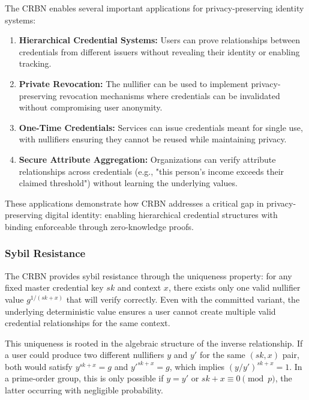 The CRBN enables several important applications for privacy-preserving identity systems:

\begin{enumerate}
    \item \textbf{Hierarchical Credential Systems:} Users can prove relationships between credentials from different issuers without revealing their identity or enabling tracking.
    
    \item \textbf{Private Revocation:} The nullifier can be used to implement privacy-preserving revocation mechanisms where credentials can be invalidated without compromising user anonymity.
    
    \item \textbf{One-Time Credentials:} Services can issue credentials meant for single use, with nullifiers ensuring they cannot be reused while maintaining privacy.
    
    \item \textbf{Secure Attribute Aggregation:} Organizations can verify attribute relationships across credentials (e.g., "this person's income exceeds their claimed threshold") without learning the underlying values.
\end{enumerate}

These applications demonstrate how CRBN addresses a critical gap in privacy-preserving digital identity: enabling hierarchical credential structures with binding enforceable through zero-knowledge proofs.


\subsubsection{Sybil Resistance}

The CRBN provides sybil resistance through the uniqueness property: for any fixed master credential key $sk$ and context $x$, there exists only one valid nullifier value $g^{1/(sk+x)}$ that will verify correctly. Even with the committed variant, the underlying deterministic value ensures a user cannot create multiple valid credential relationships for the same context.

This uniqueness is rooted in the algebraic structure of the inverse relationship. If a user could produce two different nullifiers $y$ and $y'$ for the same $(sk,x)$ pair, both would satisfy $y^{sk+x} = g$ and $y'^{sk+x} = g$, which implies $(y/y')^{sk+x} = 1$. In a prime-order group, this is only possible if $y = y'$ or $sk+x \equiv 0 \pmod{p}$, the latter occurring with negligible probability.

